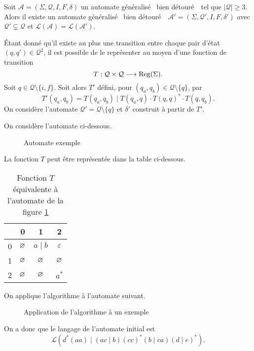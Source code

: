 \begin{lem}
	Soit $\mathcal{A} = (\Sigma, \mathcal{Q}, I, F, \delta)$\/ un automate généralisé \guillemotleft~bien détouré~\guillemotright\ tel que $|\mathcal{Q}| \ge 3$. Alors il existe un automate généralisé \guillemotleft~bien détouré~\guillemotright\ $\mathcal{A}'  =(\Sigma, \mathcal{Q}', I, F, \delta')$\/ avec $\mathcal{Q}' \subsetneq \mathcal{Q}$\/ et $\mathcal{L}(\mathcal{A}) = \mathcal{L}(\mathcal{A}')$.
\end{lem}

\begin{prv}
	Étant donné qu'il existe au plus une transition entre chaque pair d'état $(q, q') \in \mathcal{Q}^2$, il est possible de le représenter au moyen d'une fonction de transition \[
		T : \mathcal{Q} \times \mathcal{Q} \longrightarrow \operatorname{Reg}(\Sigma)
	.\]
	Soit $q \in \mathcal{Q} \setminus \{i,f\}$. Soit alors $T'$\/ défini, pour $(q_a, q_b) \in \mathcal{Q} \setminus \{q\}$, par \[
		T'(q_a, q_b) = T(q_a, q_b)  \mid T(q_a, q) \cdot T(q,q)^* \cdot T(q,q_b)
	.\] On considère l'automate $\mathcal{Q}' = \mathcal{Q} \setminus \{q\}$\/ et $\delta'$\/ construit à partir de $T'$.
\end{prv}

\begin{exm}
	On considère l'automate ci-dessous.
	\begin{figure}[H]
		\centering
		\caption{Automate exemple}
		\label{aut:a11}
	\end{figure}
	La fonction $T$\/ peut être représentée dans la table ci-dessous.
	\begin{table}[H]
		\centering
		\begin{tabular}{c|ccc}
			&0&1&2\\\hline
			0&$\varnothing$&$a \mid b$&$\varepsilon$ \\
			1&$\varnothing$\/ &$\varnothing$\/ &$\varnothing$\/ \\
			2&$\varnothing$\/ &$\varnothing$\/ &$a^*$\/\\
		\end{tabular}
		\caption{Fonction $T$\/ équivalente à l'automate de la figure \ref{aut:a11}}
	\end{table}
\end{exm}

\begin{exm}
	On applique l'algorithme à l'automate suivant.
	\begin{figure}[H]
		\centering
		\caption{Application de l'algorithme à un exemple}
	\end{figure}
	On a donc que le langage de l'automate initial est \[
		\mathcal{L}(d^* (aa) \mid (ac \mid b)(cc)^*(b \mid ca)(d \mid e)^*)
	.\]
\end{exm}

